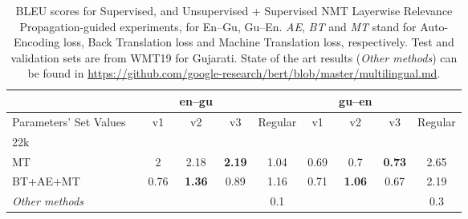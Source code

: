 \documentclass[11pt]{article}
\begin{document}
\begin{table*}[!htbp]
\small
\centering
\begin{tabular}{lcccc|c|ccc|c}
\toprule
&&& \textbf{en--gu} &&&& \textbf{gu--en} && \\\hline
\midrule
Parameters' Set Values &  & v1 & v2 & v3 &Regular& v1 & v2 & v3 &Regular \\\hline
22k &&&&&\\
\midrule
MT && 2 & 2.18 &\textbf{2.19}&1.04&0.69&0.7 &\textbf{0.73}&2.65 \\
BT+AE+MT &&0.76&\textbf{1.36}&0.89&1.16 &0.71&\textbf{1.06}&0.67&2.19\\\hline
\midrule
{\emph{Other methods}} &&&&&0.1&  &&&0.3\\
\bottomrule
\end{tabular}

\caption{BLEU scores for Supervised, and Unsupervised + Supervised NMT Layerwise Relevance Propagation-guided experiments, for En--Gu, Gu--En. \emph{AE}, \emph{BT} and \emph{MT} stand for Auto-Encoding loss, Back Translation loss and Machine Translation loss, respectively. Test and validation sets are from WMT19 for Gujarati. State of the art results (\textit{Other methods}) can be found in \url{https://github.com/google-research/bert/blob/master/multilingual.md}. }
\vspace{-2mm}
\label{table:bleu_results_lrp_train_gu}
\vspace{-0.5em}
\end{table*}
\end{document}
